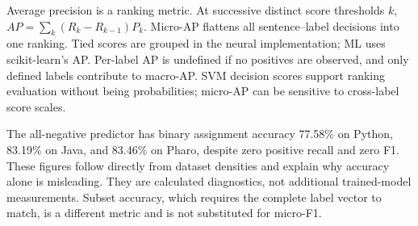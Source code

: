 Average precision is a ranking metric. At successive distinct score thresholds $k$, $AP=\sum_k(R_k-R_{k-1})P_k$. Micro-AP flattens all sentence--label decisions into one ranking. Tied scores are grouped in the neural implementation; ML uses scikit-learn's AP. Per-label AP is undefined if no positives are observed, and only defined labels contribute to macro-AP. SVM decision scores support ranking evaluation without being probabilities; micro-AP can be sensitive to cross-label score scales.

The all-negative predictor has binary assignment accuracy 77.58\% on Python, 83.19\% on Java, and 83.46\% on Pharo, despite zero positive recall and zero F1. These figures follow directly from dataset densities and explain why accuracy alone is misleading. They are calculated diagnostics, not additional trained-model measurements. Subset accuracy, which requires the complete label vector to match, is a different metric and is not substituted for micro-F1.
